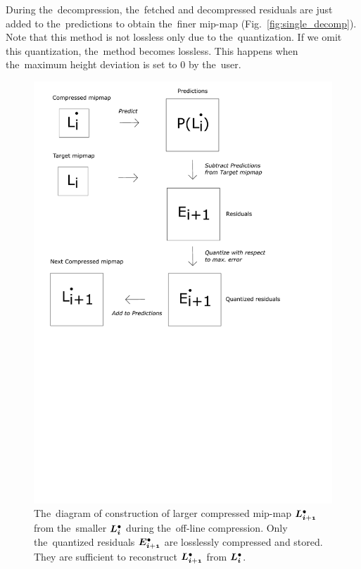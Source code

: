 During the~decompression, the~fetched and decompressed residuals are just added to the~predictions to obtain the~finer mip-map (Fig.~\ref{fig:single_decomp}). Note that this method is not lossless only due to the~quantization. If we omit this quantization, the~method becomes lossless. This happens when the~maximum height deviation is set to 0 by the~user.

\begin{figure}
	\includegraphics[trim={0 12cm 1cm 0cm}, clip, width=1\textwidth]{figures/single_reconst.pdf}\centering
	\caption{The~diagram of construction of larger compressed mip-map $\ldot{i+1}$ from the~smaller $\ldot{i}$ during the~off-line compression. Only the~quantized residuals $\objdot{E}{i+1}$ are losslessly compressed and stored. They are sufficient to reconstruct $\ldot{i+1}$ from $\ldot{i}$.}
	\label{fig:single_reconst}
\end{figure}

